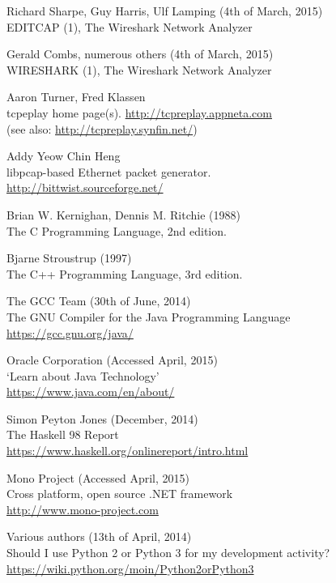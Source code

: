 \documentclass[10pt,a4paper,notitlepage,twoside]{report}
\begin{document}
\begin{thebibliography}{99}
    Richard Sharpe, Guy Harris, Ulf Lamping (4th of March, 2015)\\
    EDITCAP (1), The Wireshark Network Analyzer

    Gerald Combs, numerous others (4th of March, 2015)\\
    WIRESHARK (1), The Wireshark Network Analyzer

    Aaron Turner, Fred Klassen\\
    tcpeplay home page(s).
    \url{http://tcpreplay.appneta.com}\\
    (see also: \url{http://tcpreplay.synfin.net/})

    Addy Yeow Chin Heng\\
    libpcap-based Ethernet packet generator.\\
    \url{http://bittwist.sourceforge.net/}

	Brian W. Kernighan, Dennis M. Ritchie (1988)\\
	The C Programming Language, 2nd edition.

	Bjarne Stroustrup (1997)\\
	The C++ Programming Language, 3rd edition.

	The GCC Team (30th of June, 2014)\\
	The GNU Compiler for the Java Programming Language\\
	\url{https://gcc.gnu.org/java/}

	Oracle Corporation (Accessed April, 2015)\\
	`Learn about Java Technology'\\
	\url{https://www.java.com/en/about/}

    Simon Peyton Jones (December, 2014)\\
    The Haskell 98 Report\\
    \url{https://www.haskell.org/onlinereport/intro.html}

	Mono Project (Accessed April, 2015)\\
	Cross platform, open source .NET framework\\
	\url{http://www.mono-project.com}

    Various authors (13th of April, 2014)\\
    Should I use Python 2 or Python 3 for my development activity?\\
    \url{https://wiki.python.org/moin/Python2orPython3}


\end{thebibliography}
\end{document}
